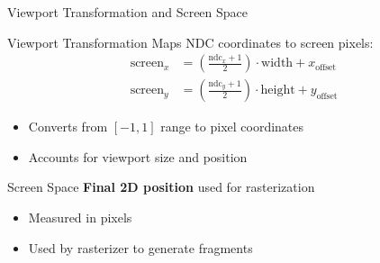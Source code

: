 \begin{frame}{Viewport Transformation and Screen Space}
  \small
  \begin{conceptbox}{Viewport Transformation}
    Maps NDC coordinates to screen pixels:
    \[
      \begin{aligned}
        \text{screen}_x &= \left( \frac{\text{ndc}_x + 1}{2} \right) \cdot \text{width} + x_{\text{offset}} \\
        \text{screen}_y &= \left( \frac{\text{ndc}_y + 1}{2} \right) \cdot \text{height} + y_{\text{offset}}
      \end{aligned}
    \]
    \begin{itemize}
      \item Converts from $[-1,1]$ range to pixel coordinates
      \item Accounts for viewport size and position
    \end{itemize}
  \end{conceptbox}

  \begin{raybox}{Screen Space}
    \textbf{Final 2D position} used for rasterization
    \begin{itemize}
      \item Measured in pixels
      \item Used by rasterizer to generate fragments
    \end{itemize}
  \end{raybox}
\end{frame}

